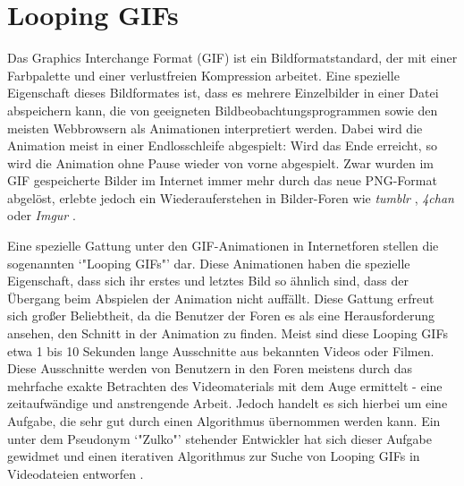 \chapter{Looping GIFs}
Das Graphics Interchange Format (GIF) ist ein Bildformatstandard, der mit einer Farbpalette und einer verlustfreien Kompression arbeitet. Eine spezielle Eigenschaft dieses Bildformates ist, dass es mehrere Einzelbilder in einer Datei abspeichern kann, die von geeigneten Bildbeobachtungsprogrammen sowie den meisten Webbrowsern als Animationen interpretiert werden. Dabei wird die Animation meist in einer Endlosschleife abgespielt: Wird das Ende erreicht, so wird die Animation ohne Pause wieder von vorne abgespielt. Zwar wurden im GIF gespeicherte Bilder im Internet immer mehr durch das neue PNG-Format abgelöst, erlebte jedoch ein Wiederauferstehen in Bilder-Foren wie \textit{tumblr} \cite{Tumblr:1}, \textit{4chan} \cite{4chan:1} oder \textit{Imgur} \cite{Imgur:1}. 

Eine spezielle Gattung unter den GIF-Animationen in Internetforen stellen die sogenannten `"Looping GIFs"' dar. Diese Animationen haben die spezielle Eigenschaft, dass sich ihr erstes und letztes Bild so ähnlich sind, dass der Übergang beim Abspielen der Animation nicht auffällt. Diese Gattung erfreut sich großer Beliebtheit, da die Benutzer der Foren es als eine Herausforderung ansehen, den Schnitt in der Animation zu finden. Meist sind diese Looping GIFs etwa 1 bis 10 Sekunden lange Ausschnitte aus bekannten Videos oder Filmen. Diese Ausschnitte werden von Benutzern in den Foren meistens durch das mehrfache exakte Betrachten des Videomaterials mit dem Auge ermittelt - eine zeitaufwändige und anstrengende Arbeit. Jedoch handelt es sich hierbei um eine Aufgabe, die sehr gut durch einen Algorithmus übernommen werden kann. Ein unter dem Pseudonym `"Zulko"' \cite{Zulko:1} stehender Entwickler hat sich dieser Aufgabe gewidmet und einen iterativen Algorithmus \cite{Goldberg:1} zur Suche von Looping GIFs in Videodateien entworfen \cite{Zulko:2}. 